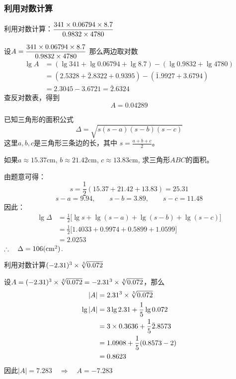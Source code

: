 \subsubsection{利用对数计算}

\begin{example}
    利用对数计算：$\dfrac{341\times 0.06794\times 8.7}{0.9832\times 4780}$
\end{example}

\begin{solution}
设$A=\dfrac{341\times 0.06794\times 8.7}{0.9832\times 4780}$
那么两边取对数
\[\begin{split}
    \lg A&=(\lg 341+\lg0.06794+\lg8.7)-(\lg0.9832+\lg4780)\\
&=(2.5328+\bar{2}.8322+0.9395)-(\bar{1}.9927+3.6794)\\
&=2.3045-3.6721=\bar{2}.6324
\end{split}\]
查反对数表，得到
\[A=0.04289\]    
\end{solution}    


\begin{example}
    已知三角形的面积公式
    \[\Delta=\sqrt{s(s-a)(s-b)(s-c)}\]
    这里$a,b,c$是三角形三条边的长，其中
    $s=\frac{a+b+c}{2}$。

    如果$a\approx 15.37$cm, $b\approx 21.42$cm, $c\approx13.83$cm,
    求三角形$ABC$的面积。
\end{example}

\begin{solution}
由题意可得：
\[s=\frac{1}{2}(15.37+21.42+13.83)=25.31\]
\[s-a=9.94,\qquad s-b=3.89,\qquad s-c=11.48\]
因此：
\[\begin{split}
    \lg \Delta&=\frac{1}{2}\bigl[\lg s+\lg(s-a)+\lg(s-b)+\lg(s-c)\bigr]\\
&=\frac{1}{2}\bigl[1.4033+0.9974+0.5899+1.0599\bigr]\\
&=2.0253
\end{split}\]
$\therefore\quad \Delta=106({\rm cm}^2)$.
\end{solution}    

\begin{example}
    利用对数计算$(-2.31)^3\times\sqrt[5]{0.072}$
\end{example}

\begin{solution}
    设$A=(-2.31)^3\times\sqrt[5]{0.072}=-2.31^3\times\sqrt[5]{0.072}$，那么
\[\begin{split}
    |A|&=2.31^3\times \sqrt[5]{0.072}\\
\lg|A|&=3\lg 2.31+\dfrac{1}{5}\lg 0.072\\
&=3\times 0.3636+\dfrac{1}{5} \bar{2}.8573\\
&=1.0908+\dfrac{1}{5}(0.8573-2)\\
&=0.8623
\end{split}\]
因此$|A|=7.283 \quad \Rightarrow\quad A=-7.283$
\end{solution}    


